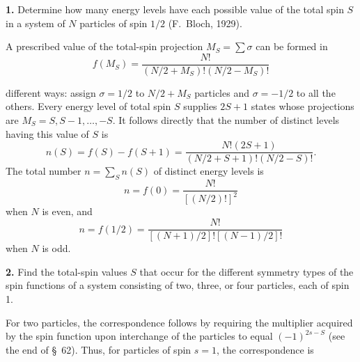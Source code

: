 \ProblemHeading

\textbf{1.} Determine how many energy levels have each possible value of the total spin $S$ in a system of $N$ particles of spin $1/2$ (F.~Bloch, 1929).

\SolutionHeading A prescribed value of the total-spin projection $M_S=\sum\sigma$ can be formed in
\[
 f(M_S)=\frac{N!}{(N/2+M_S)!(N/2-M_S)!}
\]

different ways: assign $\sigma=1/2$ to $N/2+M_S$ particles and $\sigma=-1/2$ to all the others. Every energy level of total spin $S$ supplies $2S+1$ states whose projections are $M_S=S,S-1,\ldots,-S$. It follows directly that the number of distinct levels having this value of $S$ is
\[
 n(S)=f(S)-f(S+1)=\frac{N!(2S+1)}{(N/2+S+1)!(N/2-S)!}.
\]
The total number $n=\sum_S n(S)$ of distinct energy levels is
\[
 n=f(0)=\frac{N!}{[(N/2)!]^2}
\]
when $N$ is even, and
\[
 n=f(1/2)=\frac{N!}{[(N+1)/2]![(N-1)/2]!}
\]
when $N$ is odd.

\textbf{2.} Find the total-spin values $S$ that occur for the different symmetry types of the spin functions of a system consisting of two, three, or four particles, each of spin 1.

\SolutionHeading For two particles, the correspondence follows by requiring the multiplier acquired by the spin function upon interchange of the particles to equal $(-1)^{2s-S}$ (see the end of §~62). Thus, for particles of spin $s=1$, the correspondence is
\begin{center}
\end{center}

